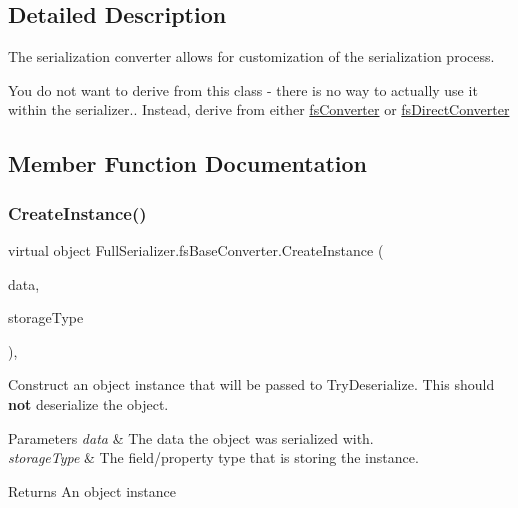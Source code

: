 \subsection{Detailed Description}
The serialization converter allows for customization of the serialization process. 

You do not want to derive from this class -\/ there is no way to actually use it within the serializer.. Instead, derive from either \hyperlink{class_full_serializer_1_1fs_converter}{fs\+Converter} or \hyperlink{class_full_serializer_1_1fs_direct_converter}{fs\+Direct\+Converter}

\subsection{Member Function Documentation}
\mbox{\label{class_full_serializer_1_1fs_base_converter_a415ea2ac9429bbb9927346af7cb7c2e1}} 
\subsubsection{\texorpdfstring{Create\+Instance()}{CreateInstance()}}
{\footnotesize\ttfamily virtual object Full\+Serializer.\+fs\+Base\+Converter.\+Create\+Instance (\begin{DoxyParamCaption}\item[{\hyperlink{class_full_serializer_1_1fs_data}{fs\+Data}}]{data,  }\item[{Type}]{storage\+Type }\end{DoxyParamCaption})\hspace{0.3cm}{\ttfamily [inline]}, {\ttfamily [virtual]}}



Construct an object instance that will be passed to Try\+Deserialize. This should {\bfseries not} deserialize the object. 


\begin{DoxyParams}{Parameters}
{\em data} & The data the object was serialized with.\\
\hline
{\em storage\+Type} & The field/property type that is storing the instance.\\
\hline
\end{DoxyParams}
\begin{DoxyReturn}{Returns}
An object instance
\end{DoxyReturn}


